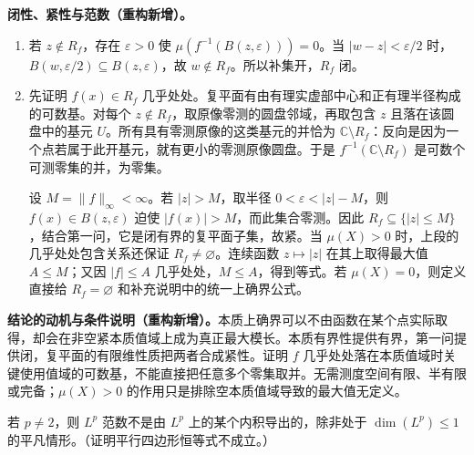\documentclass[../../main.tex]{subfiles}
\begin{document}
\begin{solution}
\textbf{闭性、紧性与范数（重构新增）。}
\begin{enumerate}
\item 若 $z\notin R_f$，存在 $\varepsilon>0$ 使 $\mu(f^{-1}(B(z,\varepsilon)))=0$。当 $|w-z|<\varepsilon/2$ 时，$B(w,\varepsilon/2)\subseteq B(z,\varepsilon)$，故 $w\notin R_f$。所以补集开，$R_f$ 闭。
\item 先证明 $f(x)\in R_f$ 几乎处处。复平面有由有理实虚部中心和正有理半径构成的可数基。对每个 $z\notin R_f$，取原像零测的圆盘邻域，再取包含 $z$ 且落在该圆盘中的基元 $U$。所有具有零测原像的这类基元的并恰为 $\mathbb C\setminus R_f$：反向是因为一个点若属于此开基元，就有更小的零测原像圆盘。于是 $f^{-1}(\mathbb C\setminus R_f)$ 是可数个可测零集的并，为零集。

设 $M=\|f\|_\infty<\infty$。若 $|z|>M$，取半径 $0<\varepsilon<|z|-M$，则 $f(x)\in B(z,\varepsilon)$ 迫使 $|f(x)|>M$，而此集合零测。因此 $R_f\subseteq\{|z|\leqslant M\}$，结合第一问，它是闭有界的复平面子集，故紧。当 $\mu(X)>0$ 时，上段的几乎处处包含关系还保证 $R_f\ne\varnothing$。连续函数 $z\mapsto|z|$ 在其上取得最大值 $A\leqslant M$；又因 $|f|\leqslant A$ 几乎处处，$M\leqslant A$，得到等式。若 $\mu(X)=0$，则定义直接给 $R_f=\varnothing$ 和补充说明中的统一上确界公式。
\end{enumerate}
\end{solution}
\begin{remark}
\textbf{结论的动机与条件说明（重构新增）。}本质上确界可以不由函数在某个点实际取得，却会在非空紧本质值域上成为真正最大模长。本质有界性提供有界，第一问提供闭，复平面的有限维性质把两者合成紧性。证明 $f$ 几乎处处落在本质值域时关键使用值域的可数基，不能直接把任意多个零集取并。无需测度空间有限、半有限或完备；$\mu(X)>0$ 的作用只是排除空本质值域导致的最大值无定义。
\end{remark}
\begin{exercise}\label{exercise:ch06-inner-product-exponent}
若 $p\ne2$，则 $L^p$ 范数不是由 $L^p$ 上的某个内积导出的，除非处于 $\dim(L^p)\leqslant1$ 的平凡情形。（证明平行四边形恒等式不成立。）
\end{exercise}
\end{document}
